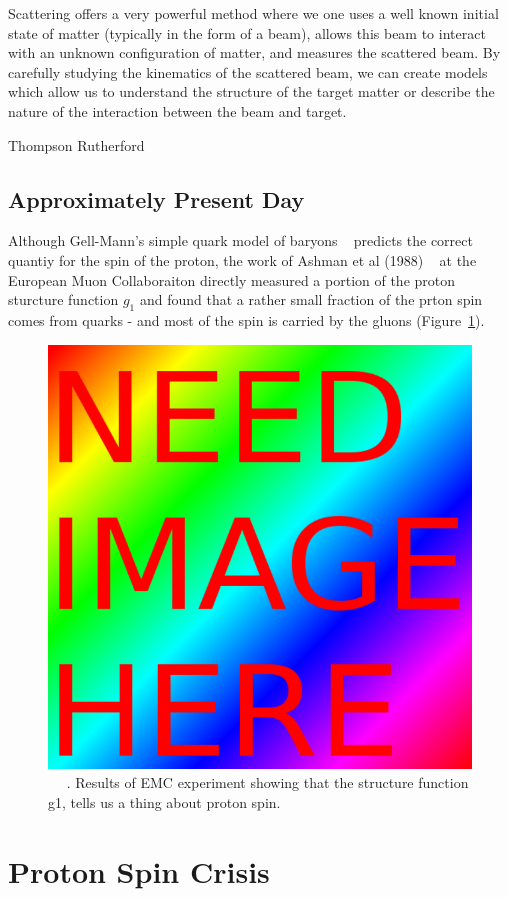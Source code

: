 Scattering offers a very powerful method where we one uses a well known initial
state of matter (typically in the form of a beam), allows this beam to interact
with an unknown configuration of matter, and measures the scattered beam. By
carefully studying the kinematics of the scattered beam, we can create models
which allow us to understand the structure of the target matter or describe the
nature of the interaction between the beam and target. 

Thompson
Rutherford

\subsection{Approximately Present Day}


Although Gell-Mann's simple quark model of baryons ~\needcite{} predicts the
correct quantiy for the spin of the proton, the work of Ashman et al (1988)
~\needcite{} at the European Muon Collaboraiton directly measured a portion of
the proton sturcture function $g_1$ and found that a rather small fraction of
the prton spin comes from quarks - and most of the spin is carried by the
gluons (Figure~\ref{fig:emc_g1_result}). 

\begin{figure}[H]
	\begin{center}
	\includegraphics[width=0.5\linewidth]{../filler/squareimg.png}
	\caption{~\needfig{} ~\needcap{}. Results of EMC experiment showing that the structure
	function g1, tells us a thing about proton spin.}
	\label{fig:emc_g1_result}
\end{center}
\end{figure}

\section{Proton Spin Crisis}
